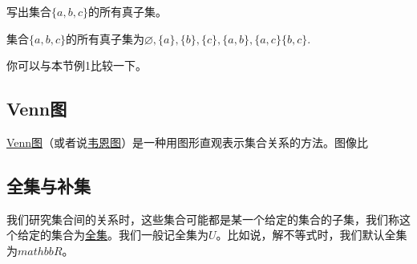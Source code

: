 \documentclass[lang=cn,math=cm,chinesefont=nofont,11pt,scheme=chinese]{elegantbook}
\begin{document}
\begin{example}
  写出集合$\{a,b,c\}$的所有真子集。
\end{example}
\begin{solution}集合$\{a,b,c\}$的所有真子集为$\varnothing ,\{a\},\{b\},\{c\},\{a,b\},\{a,c\}\{b,c\}$.
\end{solution}

\begin{remark}
  你可以与本节例1比较一下。
\end{remark}

\subsection{Venn图}
  \underline{Venn图}（或者说\underline{韦恩图}）是一种用图形直观表示集合关系的方法。图像比


\subsection{全集与补集}
  我们研究集合间的关系时，这些集合可能都是某一个给定的集合的子集，我们称这个给定的集合为\underline{全集}。我们一般记全集为$U$。比如说，解不等式时，我们默认全集为$mathbb{R}$。
\end{document}
